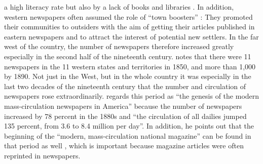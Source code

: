 a high literacy rate but also by a lack of books and libraries \citep[232]{Cloud1998}. In addition, western newspapers often assumed the role of “town boosters” \citep[232]{Cloud1998}: They promoted their communities to outsiders with the aim of getting their articles published in eastern newspapers and to attract the interest of potential new settlers. In the far west of the country, the number of newspapers therefore increased greatly especially in the second half of the nineteenth century. \citet[233]{Cloud1998} notes that there were 11 newspapers in the 11 western states and territories in 1850, and more than 1,000 by 1890. Not just in the West, but in the whole country it was especially in the last two decades of the nineteenth century that the number and circulation of newspapers rose extraordinarily. \citet[228]{Nord2001} regards this period as “the genesis of the modern mass-circulation newspapers in America” because the number of newspapers increased by 78 percent in the 1880s and “the circulation of all dailies jumped 135 percent, from 3.6 to 8.4 million per day”. In addition, he points out that the beginning of the “modern, mass-circulation national magazine” can be found in that period as well \citep[228]{Nord2001}, which is important because magazine articles were often reprinted in newspapers.

